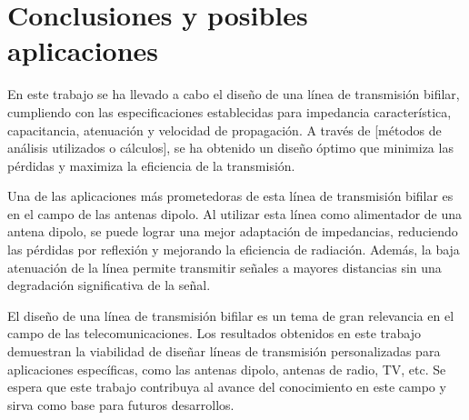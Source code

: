\section{Conclusiones y posibles aplicaciones}

En este trabajo se ha llevado a cabo el diseño de una línea de transmisión bifilar, cumpliendo con las especificaciones establecidas para impedancia característica, capacitancia, atenuación y velocidad de propagación. A través de [métodos de análisis utilizados o cálculos], se ha obtenido un diseño óptimo que minimiza las pérdidas y maximiza la eficiencia de la transmisión.

Una de las aplicaciones más prometedoras de esta línea de transmisión bifilar es en el campo de las antenas dipolo. Al utilizar esta línea como alimentador de una antena dipolo, se puede lograr una mejor adaptación de impedancias, reduciendo las pérdidas por reflexión y mejorando la eficiencia de radiación. Además, la baja atenuación de la línea permite transmitir señales a mayores distancias sin una degradación significativa de la señal.

El diseño de una línea de transmisión bifilar es un tema de gran relevancia en el campo de las telecomunicaciones. Los resultados obtenidos en este trabajo demuestran la viabilidad de diseñar líneas de transmisión personalizadas para aplicaciones específicas, como las antenas dipolo, antenas de radio, TV, etc. Se espera que este trabajo contribuya al avance del conocimiento en este campo y sirva como base para futuros desarrollos.



\pagebreak
